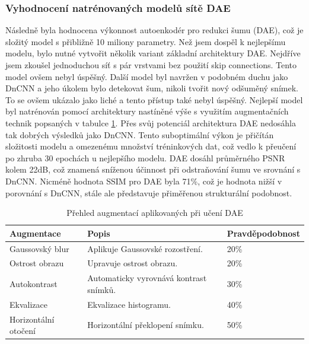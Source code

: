 \documentclass[male,czech,api_ing]{thesis}
\begin{document}
\subsubsection{Vyhodnocení natrénovaných modelů sítě DAE}
Následně byla hodnocena výkonnost autoenkodér pro redukci šumu (DAE), což je složitý model s přibližně 10 miliony parametry. Než jsem dospěl k nejlepšímu modelu, bylo nutné vytvořit několik variant základní architektury DAE. Nejdříve jsem zkoušel jednoduchou síť s pár vrstvami bez použití skip connections. Tento model ovšem nebyl úspěšný. Další model byl navržen v podobném duchu jako DnCNN a jeho úkolem bylo detekovat šum, nikoli tvořit nový odšuměný snímek. To se ovšem ukázalo jako liché a tento přístup také nebyl úspěšný. Nejlepší model byl natrénován pomocí architektury nastíněné výše s využitím augmentačních technik popsaných v tabulce \ref{tab:DAE_augmentation}. Přes svůj potenciál architektura DAE nedosáhla tak dobrých výsledků jako DnCNN. Tento suboptimální výkon je přičítán složitosti modelu a omezenému množství tréninkových dat, což vedlo k přeučení po zhruba 30 epochách u nejlepšího modelu. DAE dosáhl průměrného PSNR kolem 22dB, což znamená sníženou účinnost při odstraňování šumu ve srovnání s DnCNN. Nicméně hodnota SSIM pro DAE byla 71\%, což je hodnota nižší v porovnání s DnCNN, stále ale představuje přiměřenou strukturální podobnost.

\begin{table}[h]
    \centering
    \begin{tabular}{|l|l|l|}
    \hline
    \textbf{Augmentace}  & \textbf{Popis}                            & \textbf{Pravděpodobnost}  \\ \hline
    Gaussovský blur      & Aplikuje Gaussovské rozostření.           &  20\%                     \\ \hline
    Ostrost obrazu       & Upravuje ostrost obrazu.                  &  20\%                     \\ \hline
    Autokontrast         & Automaticky vyrovnává kontrast snímků.    &  30\%                     \\ \hline
    Ekvalizace           & Ekvalizace histogramu.                    &  40\%                     \\ \hline
    Horizontální otočení & Horizontální překlopení snímku.           &  50\%                     \\ \hline
    \end{tabular}
    \caption{Přehled augmentací aplikovaných při učení DAE}
    \label{tab:DAE_augmentation}
\end{table}
\end{document}
